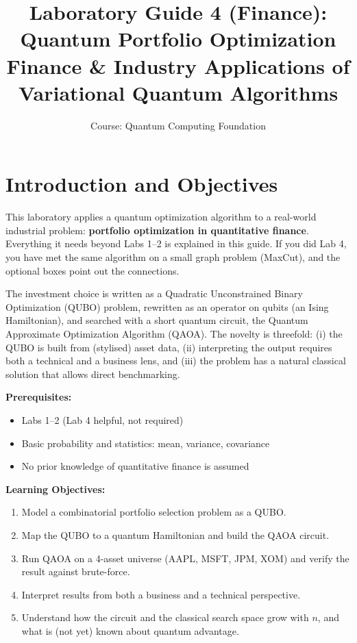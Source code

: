 \documentclass[a4paper,11pt]{article}
\title{\textbf{Laboratory Guide 4 (Finance): Quantum Portfolio Optimization}\\
\large Finance \& Industry Applications of Variational Quantum Algorithms}
\author{Course: Quantum Computing Foundation}
\date{}
\begin{document}
\maketitle
\tableofcontents
\newpage

\section{Introduction and Objectives}

This laboratory applies a quantum optimization algorithm to a real-world
industrial problem: \textbf{portfolio optimization in quantitative finance}.
Everything it needs beyond Labs 1--2 is explained in this guide. If you did
Lab 4, you have met the same algorithm on a small graph problem (MaxCut), and
the optional boxes point out the connections.

The investment choice is written as a Quadratic Unconstrained Binary
Optimization (QUBO) problem, rewritten as an operator on qubits (an Ising
Hamiltonian), and searched with a short quantum circuit, the Quantum
Approximate Optimization Algorithm (QAOA). The novelty is threefold: (i) the QUBO is built from (stylised) asset data,
(ii) interpreting the output requires both a technical and a business lens,
and (iii) the problem has a natural classical solution that allows direct
benchmarking.

\vspace{0.3cm}
\noindent\textbf{Prerequisites:}
\begin{itemize}
    \item Labs 1--2 (Lab 4 helpful, not required)
    \item Basic probability and statistics: mean, variance, covariance
    \item No prior knowledge of quantitative finance is assumed
\end{itemize}

\noindent\textbf{Learning Objectives:}
\begin{enumerate}
    \item Model a combinatorial portfolio selection problem as a QUBO.
    \item Map the QUBO to a quantum Hamiltonian and build the QAOA circuit.
    \item Run QAOA on a 4-asset universe (AAPL, MSFT, JPM, XOM) and
          verify the result against brute-force.
    \item Interpret results from both a business and a technical perspective.
    \item Understand how the circuit and the classical search space grow
          with $n$, and what is (not yet) known about quantum advantage.
\end{enumerate}
\end{document}
